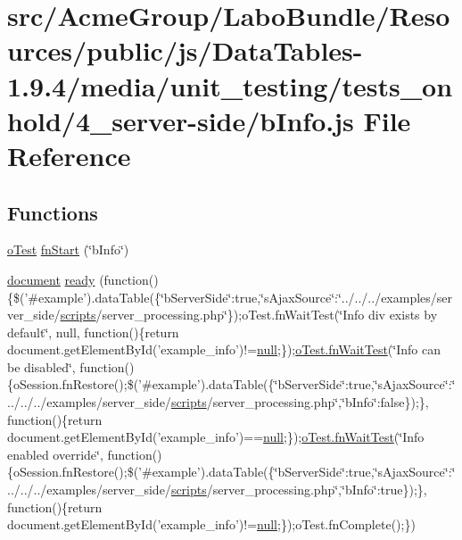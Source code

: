\hypertarget{4__server-side_2b_info_8js}{\section{src/\+Acme\+Group/\+Labo\+Bundle/\+Resources/public/js/\+Data\+Tables-\/1.9.4/media/unit\+\_\+testing/tests\+\_\+onhold/4\+\_\+server-\/side/b\+Info.js File Reference}
\label{4__server-side_2b_info_8js}
}
\subsection*{Functions}
\begin{DoxyCompactItemize}
\item 
\hyperlink{unit__test_8js_a3b2d259e2df3b6860d9047a92d09d0d6}{o\+Test} \hyperlink{4__server-side_2b_info_8js_ae3816ae9c383626bf8eff315ee5a15db}{fn\+Start} (\char`\"{}b\+Info\char`\"{})
\item 
\hyperlink{outside_events_8js_aa14f8e0338cced6720590fd2ea13bd4b}{document} \hyperlink{4__server-side_2b_info_8js_a56241109f14b9f87ca2befe9fdaf2c98}{ready} (function()\{\$('\#example').data\+Table(\{\char`\"{}b\+Server\+Side\char`\"{}\+:true,\char`\"{}s\+Ajax\+Source\char`\"{}\+:\char`\"{}../../../examples/server\+\_\+side/\hyperlink{tinymce_8jquery_8dev_8js_a09066d4d580eeec222f858d588b4cdef}{scripts}/server\+\_\+processing.\+php\char`\"{}\});o\+Test.\+fn\+Wait\+Test(\char`\"{}Info div exists by default\char`\"{}, null, function()\{return document.\+get\+Element\+By\+Id('example\+\_\+info')!=\hyperlink{validate_8js_afb8e110345c45e74478894341ab6b28e}{null};\});\hyperlink{onhold_24__server-side_2__zero__config_8js_ab25c4d596771c0133cdc45178ce72c3d}{o\+Test.\+fn\+Wait\+Test}(\char`\"{}Info can be disabled\char`\"{}, function()\{o\+Session.\+fn\+Restore();\$('\#example').data\+Table(\{\char`\"{}b\+Server\+Side\char`\"{}\+:true,\char`\"{}s\+Ajax\+Source\char`\"{}\+:\char`\"{}../../../examples/server\+\_\+side/\hyperlink{tinymce_8jquery_8dev_8js_a09066d4d580eeec222f858d588b4cdef}{scripts}/server\+\_\+processing.\+php\char`\"{},\char`\"{}b\+Info\char`\"{}\+:false\});\}, function()\{return document.\+get\+Element\+By\+Id('example\+\_\+info')==\hyperlink{validate_8js_afb8e110345c45e74478894341ab6b28e}{null};\});\hyperlink{onhold_24__server-side_2__zero__config_8js_ab25c4d596771c0133cdc45178ce72c3d}{o\+Test.\+fn\+Wait\+Test}(\char`\"{}Info enabled override\char`\"{}, function()\{o\+Session.\+fn\+Restore();\$('\#example').data\+Table(\{\char`\"{}b\+Server\+Side\char`\"{}\+:true,\char`\"{}s\+Ajax\+Source\char`\"{}\+:\char`\"{}../../../examples/server\+\_\+side/\hyperlink{tinymce_8jquery_8dev_8js_a09066d4d580eeec222f858d588b4cdef}{scripts}/server\+\_\+processing.\+php\char`\"{},\char`\"{}b\+Info\char`\"{}\+:true\});\}, function()\{return document.\+get\+Element\+By\+Id('example\+\_\+info')!=\hyperlink{validate_8js_afb8e110345c45e74478894341ab6b28e}{null};\});o\+Test.\+fn\+Complete();\})
\end{DoxyCompactItemize}


